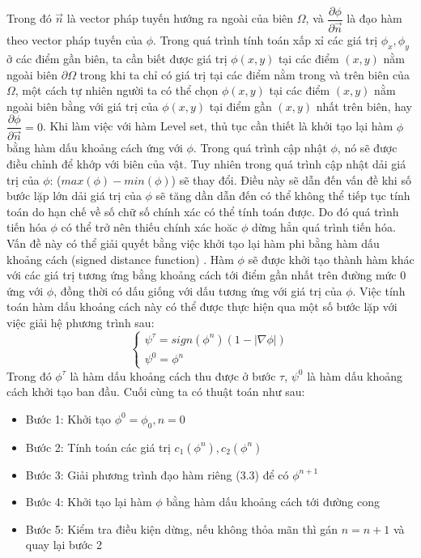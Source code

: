 \documentclass[12pt, oneside, a4]{book}
\begin{document}
Trong đó $\vec{n}$ là vector pháp tuyến hướng ra ngoài của biên $\Omega$, và $\dfrac{\partial \phi}{\partial \vec{n}} $ là đạo hàm theo vector pháp tuyến của $\phi$. Trong quá trình tính toán xấp xỉ các giá trị $\phi_x, \phi_y$ ở các điểm gần biên, ta cần biết được giá trị $\phi(x,y)$ tại các điểm $(x, y)$ nằm ngoài biên $\partial \Omega$ trong khi ta chỉ có giá trị tại các điểm nằm trong và trên biên của $\Omega$, một cách tự nhiên người ta có thể chọn $\phi(x,y)$ tại các điểm $(x, y)$ nằm ngoài biên bằng với giá trị của $\phi(x,y)$ tại điểm gần $(x,y)$  nhất trên biên, hay $\dfrac{\partial \phi}{\partial \vec{n}}=0$. Khi làm việc với hàm Level set, thủ tục cần thiết là khởi tạo lại hàm $\phi$ bằng hàm dấu khoảng cách ứng với $\phi$. Trong quá trình cập nhật $\phi$, nó sẽ được điều chỉnh để khớp với biên của vật. Tuy nhiên trong quá trình cập nhật dải giá trị của $\phi$: ($max(\phi)-min(\phi)$) sẽ thay đổi. Điều này sẽ dẫn đến vấn đề  khi số bước lặp lớn dải giá trị của $\phi$ sẽ tăng dần  dẫn đến có thể không thể tiếp tục tính toán do hạn chế về số chữ số chính xác có thể tính toán được. Do đó quá trình tiến hóa $\phi$ có thể trở nên thiếu chính xác hoăc $\phi$ dừng hẳn quá trình tiến hóa. Vấn đề này có thể giải quyết bằng việc khởi tạo lại hàm phi bằng hàm dấu khoảng cách (signed distance function) . Hàm $\phi$ sẽ được khởi tạo thành hàm khác với các giá trị tương ứng bằng khoảng cách tới điểm gần nhất trên đường mức 0 ứng với $\phi$, đồng thời có dấu giống với dấu tương ứng với giá trị của $\phi$. Việc tính toán hàm dấu khoảng cách này có thể được thực hiện qua một số bước lặp với việc giải hệ phương trình sau:
\begin{equation}
\begin{cases}
 \psi^{\tau}=sign(\phi^n)(1-|\nabla \phi|)\\
 \psi^{0}=\phi^n
   \end{cases}
\end{equation}
 Trong đó $\phi^{\tau}$ là hàm dấu khoảng cách thu được ở bước $\tau$, $\psi^{0}$ là hàm dấu khoảng cách khởi tạo ban đầu. Cuối cùng ta có thuật toán như sau:
\begin{itemize}
\item Bước 1: Khởi tạo $\phi^0=\phi_0, n=0$
\item Bước 2: Tính toán các giá trị $c_1(\phi^n), c_2(\phi^n)$
\item Bước 3: Giải phương trình đạo hàm riêng (3.3) để có $\phi^{n+1}$
\item Bước 4: Khởi tạo lại hàm $\phi$ bằng hàm dấu khoảng cách tới đường cong
\item Bước 5: Kiểm tra điều kiện dừng, nếu không thỏa mãn thì gán $n=n+1$ và quay lại bước 2
\end{itemize}
\end{document}
